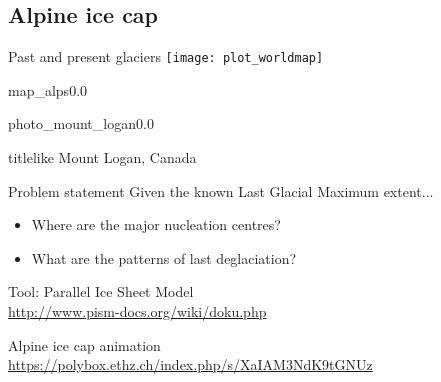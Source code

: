 
\subsection{Alpine ice cap}

    \begin{frame}{Past and present glaciers}
      \centering
      \texttt{[image: plot\_worldmap]}
    \end{frame}

    \begin{backgroundframe}{map_alps}{0.0}{}
    \end{backgroundframe}

    \begin{backgroundframe}{photo_mount_logan}{0.0}{}
      \vspace{6cm}\hfill
      \begin{beamercolorbox}[sep=1em,wd=45mm]{titlelike}
        Mount Logan, Canada
      \end{beamercolorbox}
    \end{backgroundframe}

    \begin{frame}{Problem statement}
      Given the known Last Glacial Maximum extent...
      \bigskip
      \begin{itemize}
        \item Where are the major \alert{nucleation centres}?
        \bigskip
        \item What are the patterns of \alert{last deglaciation}?
      \end{itemize}
      \bigskip\bigskip\bigskip
      \centering
      Tool: Parallel Ice Sheet Model\\
      \url{http://www.pism-docs.org/wiki/doku.php}
    \end{frame}

    \begin{frame}{}
      \centering
      Alpine ice cap animation\\
      \bigskip
      \url{https://polybox.ethz.ch/index.php/s/XaIAM3NdK9tGNUz}\\
    \end{frame}

